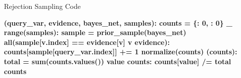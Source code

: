 \documentclass[14pt]{beamer}
\begin{document}
\begin{frame}[fragile]{Rejection Sampling Code}
	\begin{semiverbatim}\scriptsize\bfseries
		 (query_var, evidence, bayes_net, samples):
		    \pause{}
		    counts = \{: \num{0}, : \num{0}\}
		     _  range(samples):
		        sample = prior_sample(bayes_net)
		        \pause{}
		         all(sample[v.index] == evidence[v]  v  evidence):
		            counts[sample[query_var.index]] += \num{1}
		    \pause{}
		     normalize(counts)
		\pause
		 (counts):
		    \pause{}
		    total = sum(counts.values())
		     value  counts:
		        counts[value] /= total
		    \pause{}
		     counts
	\end{semiverbatim}
\end{frame}
\end{document}
